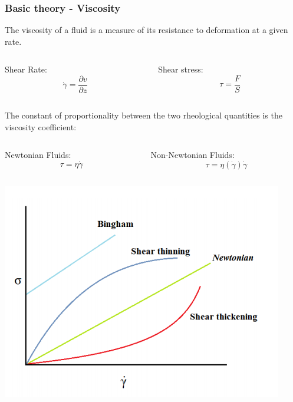 \documentclass[xcolor=table]{beamer}
\begin{document}
\begin{frame}
\end{frame}


\begin{frame}

\frametitle{Basic theory - Viscosity}
\fontsize{10}{13.2} \selectfont
The viscosity of a fluid is a measure of its resistance to deformation at a given rate.
\begin{columns}
	\begin{column}{.5\textwidth}
		Shear Rate:
		\begin{equation*}
		\dot{\gamma}=\frac{\partial v}{\partial z}
		\end{equation*}
	\end{column}
	\begin{column}{.5\textwidth}
		Shear stress:
		\begin{equation*}
		\tau=\frac{F}{S}
		\end{equation*}
	\end{column}
\end{columns}
\medskip

The constant of proportionality between the two rheological quantities is the viscosity coefficient:
\medskip
\begin{columns}
	\begin{column}{.5\textwidth}
		Newtonian Fluids:
		\begin{equation*}
		\tau=\eta\dot{\gamma}
		\end{equation*}
	\end{column}
	\begin{column}{.5\textwidth}
		Non-Newtonian Fluids:
		\begin{equation*}
		\tau=\eta(\dot{\gamma})\dot{\gamma}
		\end{equation*}
	\end{column}
\end{columns}
\centering
\includegraphics[width=.4\columnwidth]{Nonnewtonianieta.png}

\end{frame}
\end{document}
